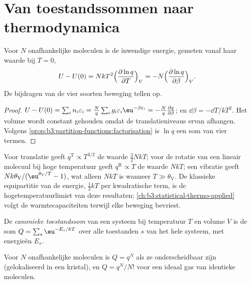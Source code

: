 \section{Van toestandssommen naar thermodynamica}

\begin{theorem}\label{thm:b3:partition-functions:internal-energy}
Voor $N$ onafhankelijke moleculen is de inwendige energie, gemeten vanaf
haar waarde bij
$T = 0$,
\[
  U - U(0) = NkT^2\Bigl(\frac{\partial\ln q}{\partial T}\Bigr)_V
          = -N\Bigl(\frac{\partial\ln q}{\partial\beta}\Bigr)_V .
\]
De bijdragen van de vier soorten beweging tellen op.
\end{theorem}

\begin{proof}
$U - U(0) = \sum_in_i\varepsilon_i = \frac Nq\sum_ig_i\varepsilon_i\eu^{-\beta\varepsilon_i} = -\frac Nq\frac{\partial q}{\partial\beta}$;
en $\dd\beta = -\dd T/kT^2$. Het volume wordt constant gehouden omdat de
translatieniveaus ervan afhangen. Volgens \cref{prop:b3:partition-functions:factorisation} is $\ln q$ een
som van vier termen.
\end{proof}

Voor translatie geeft $q^{\mathrm T} \propto T^{3/2}$ de waarde
$\frac32NkT$; voor de rotatie van een lineair molecuul bij hoge
temperatuur geeft $q^{\mathrm R} \propto T$ de waarde $NkT$; een vibratie
geeft
$Nk\theta_{\mathrm V}/(\eu^{\theta_{\mathrm V}/T} - 1)$, wat alleen $NkT$ is wanneer $T \gg \theta_{\mathrm V}$. De
klassieke equipartitie van de energie, $\frac12kT$ per kwadratische term,
is de hogetemperatuurlimiet van deze resultaten;
\cref{ch:b3:statistical-thermo-applied} volgt de warmtecapaciteiten
terwijl elke beweging bevriest.

\begin{definition}\label{def:b3:partition-functions:canonical}
De \emph{canonieke toestandssom} van een
systeem bij temperatuur $T$ en volume $V$ is de som $Q = \sum_s\eu^{-E_s/kT}$ over alle
toestanden $s$ van het hele systeem, met energieën $E_s$.
\end{definition}

\begin{proposition}\label{prop:b3:partition-functions:canonical}
Voor $N$ onafhankelijke moleculen is $Q = q^N$ als ze onderscheidbaar zijn
(gelokaliseerd in een kristal), en $Q = q^N/N!$ voor een ideaal gas van
identieke moleculen.
\end{proposition}

